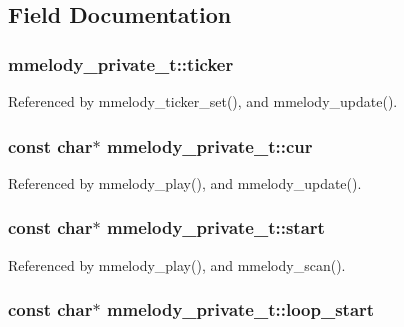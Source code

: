 \subsection{Field Documentation}
\hypertarget{structmmelody__private__t_a87534879a34764ca8706fab5aab993e}{
\subsubsection{ {\bf mmelody\_\-private\_\-t::ticker}}}
\label{structmmelody__private__t_a87534879a34764ca8706fab5aab993e}




Referenced by mmelody\_\-ticker\_\-set(), and mmelody\_\-update().\hypertarget{structmmelody__private__t_c99d0ddec5abf76765529846c1c7e4d8}{
\subsubsection{\setlength{\rightskip}{0pt plus 5cm}const char$\ast$ {\bf mmelody\_\-private\_\-t::cur}}}
\label{structmmelody__private__t_c99d0ddec5abf76765529846c1c7e4d8}




Referenced by mmelody\_\-play(), and mmelody\_\-update().\hypertarget{structmmelody__private__t_c3a07b44702142a79267f35a60e7cd77}{
\subsubsection{\setlength{\rightskip}{0pt plus 5cm}const char$\ast$ {\bf mmelody\_\-private\_\-t::start}}}
\label{structmmelody__private__t_c3a07b44702142a79267f35a60e7cd77}




Referenced by mmelody\_\-play(), and mmelody\_\-scan().\hypertarget{structmmelody__private__t_334763e1e4d9d12a80188e41492a25a4}{
\subsubsection{\setlength{\rightskip}{0pt plus 5cm}const char$\ast$ {\bf mmelody\_\-private\_\-t::loop\_\-start}}}
\label{structmmelody__private__t_334763e1e4d9d12a80188e41492a25a4}




